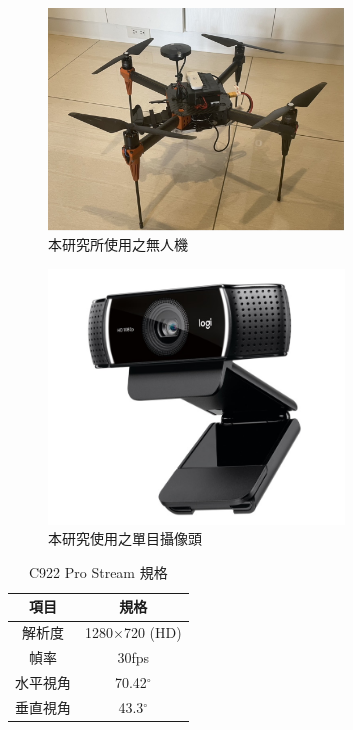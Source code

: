 \documentclass[12pt]{article}       %
\begin{document}
\begin{figure}[H]
    \centering
    \includegraphics[width=0.7\textwidth]{UAVphoto.jpg}     %
    \caption{本研究所使用之無人機}    %
    \label{fig:UAVphoto}    %
\end{figure}

\begin{figure}[H]
    \centering
    \includegraphics[width=0.7\textwidth]{c922.jpg}     %
    \caption{本研究使用之單目攝像頭\cite{logitech}}    %
    \label{fig:c922}    %
\end{figure}

\begin{table}[H]
    \caption{C922 Pro Stream 規格}
    \vspace{12pt} %
    \renewcommand{\arraystretch}{1.5} %
    \centering
    \begin{tabular}{|c|c|}
        \hline
        項目   & 規格              \\ \hline
        解析度  & 1280$\times$720 (HD) \\ \hline
        幀率   & 30fps           \\ \hline
        水平視角 & 70.42$^\circ$         \\ \hline
        垂直視角 & 43.3$^\circ$           \\ \hline
    \end{tabular}
    \label{tab:C922 Pro}
\end{table}
\end{document}
